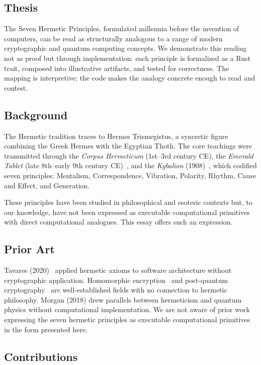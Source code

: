 \documentclass[sigplan,anonymous=false]{acmart}
\begin{document}
\subsection{Thesis}

The Seven Hermetic Principles, formulated millennia before the invention of computers, can be read as structurally analogous to a range of modern cryptographic and quantum computing concepts. We demonstrate this reading not as proof but through implementation: each principle is formalized as a Rust trait, composed into illustrative artifacts, and tested for correctness. The mapping is interpretive; the code makes the analogy concrete enough to read and contest.

\subsection{Background}

The Hermetic tradition traces to Hermes Trismegistus, a syncretic figure combining the Greek Hermes with the Egyptian Thoth. The core teachings were transmitted through the \emph{Corpus Hermeticum} (1st--3rd century CE), the \emph{Emerald Tablet} (late 8th--early 9th century CE)~\cite{emerald}, and the \emph{Kybalion} (1908)~\cite{kybalion}, which codified seven principles: Mentalism, Correspondence, Vibration, Polarity, Rhythm, Cause and Effect, and Generation.

These principles have been studied in philosophical and esoteric contexts but, to our knowledge, have not been expressed as executable computational primitives with direct computational analogues. This essay offers such an expression.

\subsection{Prior Art}

Tavares (2020)~\cite{tavares} applied hermetic axioms to software architecture without cryptographic application. Homomorphic encryption~\cite{gentry} and post-quantum cryptography~\cite{regev} are well-established fields with no connection to hermetic philosophy. Morgan (2018) drew parallels between hermeticism and quantum physics without computational implementation. We are not aware of prior work expressing the seven hermetic principles as executable computational primitives in the form presented here.

\subsection{Contributions}
\end{document}
